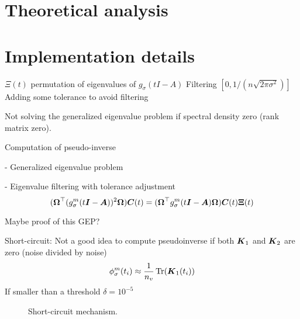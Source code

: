 \section{Theoretical analysis}
\label{sec:3-nystrom-theoretical-analysis}



\section{Implementation details}
\label{sec:3-nystrom-implementation-details}

$\Xi(t)$ permutation of eigenvalues of $g_{\sigma}(tI - A)$
Filtering $[0, 1 / (n \sqrt{2 \pi \sigma^2})]$ \cite{lin2017randomized}
Adding some tolerance to avoid filtering

Not solving the generalized eigenvalue problem if spectral density zero (rank matrix zero).

Computation of pseudo-inverse

- Generalized eigenvalue problem

- Eigenvalue filtering with tolerance adjustment
\begin{equation}
    (\boldsymbol{\Omega}^{\top} (g_{\sigma}^m(t\boldsymbol{I} - \boldsymbol{A}))^2 \boldsymbol{\Omega}) \boldsymbol{C}(t) = (\boldsymbol{\Omega}^{\top} g_{\sigma}^m(t\boldsymbol{I} - \boldsymbol{A}) \boldsymbol{\Omega}) \boldsymbol{C}(t) \boldsymbol{\Xi}(t)
    \label{equ:3-nystrom-generalized-eigenproblem}
\end{equation}

Maybe proof of this GEP?

Short-circuit: Not a good idea to compute pseudoinverse if
both $\boldsymbol{K}_1$ and $\boldsymbol{K}_2$ are zero (noise divided by noise)
\begin{equation}
    \phi_{\sigma}^m(t_i) \approx \frac{1}{n_v} \operatorname{Tr}(\boldsymbol{K}_1(t_i))
    \label{equ:3-nystrom-shortcircuit-hutchinson}
\end{equation}
If smaller than a threshold $\delta = 10^{-5}$

\begin{figure}[ht]
    \centering
    
    \caption{Short-circuit mechanism.}
    \label{fig:3-nystrom-short-circuit-mechanism}
\end{figure}


